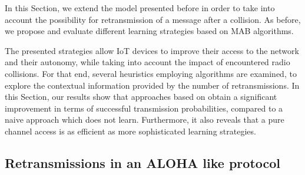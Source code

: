 
\graphicspath{{2-Chapters/4-Chapter/IEEE_WCNC__2019__Paper__BMBM.git/}}

In this Section, we extend the model presented before in order to take into account the possibility for retransmission of a message after a collision.
As before, we propose and evaluate different learning strategies based on MAB algorithms.

The presented strategies allow IoT devices to improve their access to the network and their autonomy, while taking into account the impact of encountered radio collisions.
For that end, several heuristics employing \UCB{} algorithms are examined, to explore the contextual information provided by the number of retransmissions.
In this Section, our results show that approaches based on \UCB{} obtain a significant improvement in terms of successful transmission probabilities, compared to a naive approach which does not learn.
Furthermore, it also reveals that a pure \UCB{} channel access is as efficient as more sophisticated learning strategies.






\subsection{Retransmissions in an ALOHA like protocol}
\label{sub:43:introduction}

